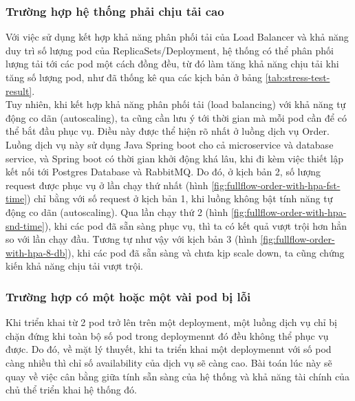 \subsubsection{Trường hợp hệ thống phải chịu tải cao}
\noindent Với việc sử dụng kết hợp khả năng phân phối tải của Load Balancer và khả năng duy trì số lượng pod của ReplicaSets/Deployment, hệ thống có thể phân phối lượng tải tới các pod một cách đồng đều, từ đó làm tăng khả năng chịu tải khi tăng số lượng pod, như đã thống kê qua các kịch bản ở bảng \ref{tab:stress-test-result}.\\[0.5cm]
Tuy nhiên, khi kết hợp khả năng phân phối tải (load balancing) với khả năng tự động co dãn (autoscaling), ta cũng cần lưu ý tới thời gian mà mỗi pod cần để có thể bắt đầu phục vụ. Điều này được thể hiện rõ nhất ở luồng dịch vụ Order. Luồng dịch vụ này sử dụng Java Spring boot cho cả microservice và database service, và Spring boot có thời gian khởi động khá lâu, khi đi kèm việc thiết lập kết nối tới Postgres Database và RabbitMQ. Do đó, ở kịch bản 2, số lượng request được phục vụ ở lần chạy thứ nhất (hình \ref{fig:fullflow-order-with-hpa-fst-time}) chỉ bằng với số request ở kịch bản 1, khi luồng không bật tính năng tự động co dãn (autoscaling). Qua lần chạy thứ 2 (hình \ref{fig:fullflow-order-with-hpa-snd-time}), khi các pod đã sẵn sàng phục vụ, thì ta có kết quả vượt trội hơn hẳn so với lần chạy đầu. Tương tự như vậy với kịch bản 3 (hình \ref{fig:fullflow-order-with-hpa-8-db}), khi các pod đã sẵn sàng và chưa kịp scale down, ta cũng chứng kiến khả năng chịu tải vượt trội.
\subsubsection{Trường hợp có một hoặc một vài pod bị lỗi}
\noindent Khi triển khai từ 2 pod trở lên trên một deployment, một luồng dịch vụ chỉ bị chặn đứng khi toàn bộ số pod trong deploymennt đó đều không thể phục vụ được. Do đó, về mặt lý thuyết, khi ta triển khai một deploymennt với số pod càng nhiều thì chỉ số availability của dịch vụ sẽ càng cao. Bài toán lúc này sẽ quay về việc cân bằng giữa tính sẵn sàng của hệ thống và khả năng tài chính của chủ thể triển khai hệ thống đó.